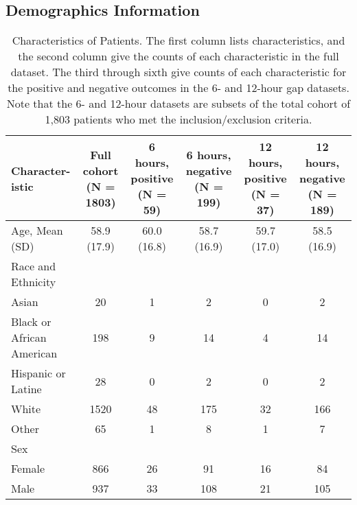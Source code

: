 \subsection{Demographics Information} \label{sec:supp_demographics}
\begin{table}[htb]
    \centering
    \begin{tabularx}{\linewidth}{L C C C C C}
    \hline
    Character-istic & Full cohort (N = 1803) & 6 hours, positive (N = 59) & 6 hours, negative (N = 199) & 12 hours, positive (N = 37) & 12 hours, negative (N = 189)\\
    \hline
    Age, Mean (SD) & 58.9 (17.9) & 60.0 (16.8) & 58.7 (16.9) & 59.7 (17.0) & 58.5 (16.9)\\
    \hline
    \hline
    Race and Ethnicity & & & & &\\
    \hline
    Asian & 20 & 1 & 2 & 0 & 2\\
    \hline
    Black or African American & 198 & 9 & 14 & 4 & 14\\
    \hline
    Hispanic or Latine & 28 & 0 & 2 & 0 & 2\\
    \hline
    White & 1520 & 48 & 175 & 32 & 166\\
    \hline
    Other & 65 & 1 & 8 & 1 & 7\\
    \hline
    \hline
    Sex & & &\\
    \hspace{3mm} Female & 866 & 26 & 91 & 16 & 84\\
    \hspace{3mm} Male & 937 & 33 & 108 & 21 & 105\\
    \hline
    \end{tabularx}
    \caption{Characteristics of Patients. The first column lists characteristics, and the second column give the counts of each characteristic in the full dataset. The third through sixth give counts of each characteristic for the positive and negative outcomes in the 6- and 12-hour gap datasets. Note that the 6- and 12-hour datasets are subsets of the total cohort of 1,803 patients who met the inclusion/exclusion criteria.}
    \label{tab:demographics}
\end{table}